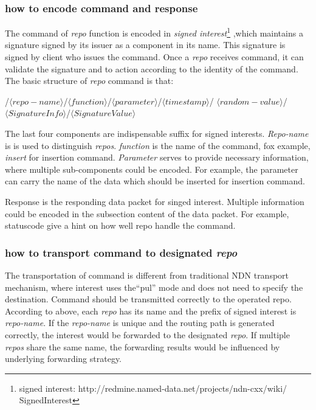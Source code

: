 \documentclass[conference]{IEEEtran}
\begin{document}
\subsubsection{how to encode command and response}

The command of \emph{repo} function is encoded in \emph{signed interest}\footnote{signed interest: http://redmine.named-data.net/projects/ndn-cxx/wiki/
SignedInterest} ,which maintains a signature signed by its issuer as a component in its name. This signature is signed by client who issues the command. Once a \emph{repo} receives command, it can validate the signature and to action according to the identity of the command. The basic structure of \emph{repo} command is that:

/$\langle repo-name\rangle$/$\langle function\rangle$/$\langle parameter\rangle$/$\langle timestamp\rangle$/
$\langle random-value\rangle$/$\langle SignatureInfo\rangle$/$\langle SignatureValue\rangle$

The last four components are indispensable suffix for signed interests. \emph{Repo-name} is is used to distinguish \emph{repos}. \emph{function} is the name of the command, fox example, \emph{insert} for insertion command. \emph{Parameter} serves to provide necessary information, where multiple sub-components could be encoded. For example, the parameter can carry the name of the data which should be inserted for insertion command.

Response is the responding data packet for singed interest. Multiple information could be encoded in the subsection content of the data packet. For example, statuscode give a hint on how well repo handle the command.

\subsubsection{how to transport command to designated \emph{repo}}

The transportation of command is different from traditional NDN transport mechanism, where interest uses the``pul'' mode and does not need to specify the destination. Command should be transmitted correctly to the operated repo. According to above, each \emph{repo} has its name and the prefix of signed interest is \emph{repo-name}. If the \emph{repo-name} is unique and the routing path is generated correctly, the interest would be forwarded to the designated \emph{repo}. If multiple \emph{repos} share the same name, the forwarding results would be influenced by underlying forwarding strategy.
\end{document}
